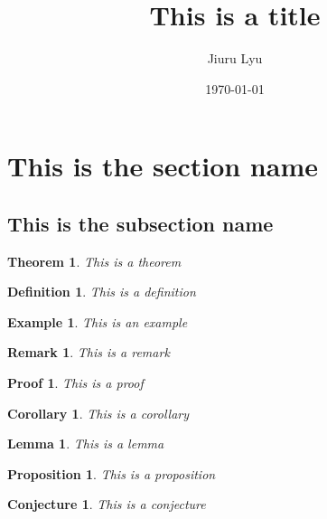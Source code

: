 \documentclass[12pt, a4paper]{article}
\title{\textbf{This is a title}}
\author{Jiuru Lyu}
\date{\today}
\newtheorem{thm}{Theorem}[subsection]
\newtheorem{df}{Definition}[subsection]
\newtheorem{eg}{Example}[subsection]
\newtheorem{rmk}{Remark}[subsection]
\newtheorem{prf}{Proof}[subsection]
\newtheorem{cor}{Corollary}[subsection]
\newtheorem{lem}{Lemma}[subsection]
\newtheorem{prop}{Proposition}[subsection]
\newtheorem{conj}{Conjecture}[subsection]
\begin{document}
\section{This is the section name}
\subsection{This is the subsection name}

\begin{thm}
	This is a theorem
\end{thm}

\begin{df}
	This is a definition
\end{df}

\begin{eg}
	This is an example
\end{eg}

\begin{rmk}
	This is a remark
\end{rmk}

\begin{prf}
	This is a proof
\end{prf}

\begin{cor}
	This is a corollary
\end{cor}

\begin{lem}
	This is a lemma
\end{lem}

\begin{prop}
	This is a proposition
\end{prop}

\begin{conj}
	This is a conjecture
\end{conj}
	
\end{document}
